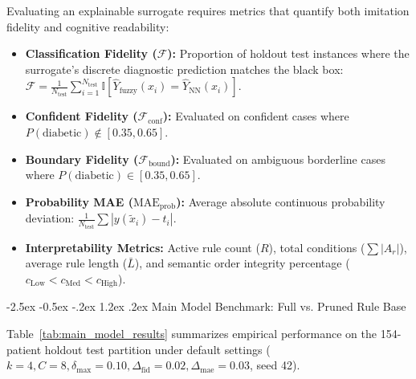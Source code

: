 \documentclass[12pt,a4paper,oneside]{report}
\makeatletter
\renewcommand\section{\@startsection {section}{1}{\z@}%
                                   {-2.5ex \@plus -0.5ex \@minus -.2ex}%
                                   {1.2ex \@plus .2ex}%
                                   {\normalfont\fontsize{13}{16}\selectfont\bfseries}}
\makeatother
\begin{document}
Evaluating an explainable surrogate requires metrics that quantify both imitation fidelity and cognitive readability:
\begin{itemize}
    \setlength{\itemsep}{0pt}
    \setlength{\parskip}{0pt}
    \item \textbf{Classification Fidelity ($\mathcal{F}$):} Proportion of holdout test instances where the surrogate's discrete diagnostic prediction matches the black box: $\mathcal{F} = \frac{1}{N_{\text{test}}} \sum_{i=1}^{N_{\text{test}}} \mathbb{I}[\hat{Y}_{\text{fuzzy}}(x_i) = \hat{Y}_{\text{NN}}(x_i)]$.
    \item \textbf{Confident Fidelity ($\mathcal{F}_{\text{conf}}$):} Evaluated on confident cases where $P(\text{diabetic}) \notin [0.35, 0.65]$.
    \item \textbf{Boundary Fidelity ($\mathcal{F}_{\text{bound}}$):} Evaluated on ambiguous borderline cases where $P(\text{diabetic}) \in [0.35, 0.65]$.
    \item \textbf{Probability MAE ($\text{MAE}_{\text{prob}}$):} Average absolute continuous probability deviation: $\frac{1}{N_{\text{test}}} \sum |y(\tilde{x}_i) - t_i|$.
    \item \textbf{Interpretability Metrics:} Active rule count ($R$), total conditions ($\sum |A_r|$), average rule length ($\bar{L}$), and semantic order integrity percentage ($c_{\text{Low}} < c_{\text{Med}} < c_{\text{High}}$).
\end{itemize}

\section{Main Model Benchmark: Full vs. Pruned Rule Base}

Table~\ref{tab:main_model_results} summarizes empirical performance on the 154-patient holdout test partition under default settings ($k=4, C=8, \delta_{\max}=0.10, \Delta_{\text{fid}}=0.02, \Delta_{\text{mae}}=0.03$, seed 42).
\end{document}
